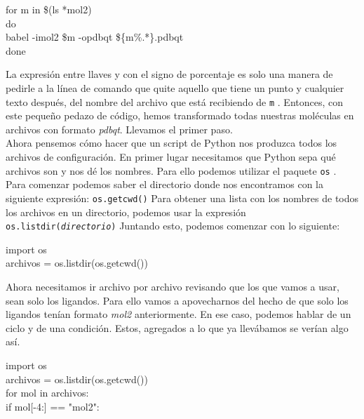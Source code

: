 \documentclass[10pt,letterpaper]{article}
\newcommand{\inlinecode}[1]{
\colorbox{light-gray}{\texttt{#1}}
}
\newenvironment{Code}
{
\begin{lrbox}{\selvestebox}%
\begin{minipage}{\dimexpr\columnwidth-2\fboxsep\relax}
\fontfamily{\ttdefault}\selectfont
}
{\end{minipage}\end{lrbox}%
\begin{center}
\colorbox{light-gray}{\usebox{\selvestebox}}
\end{center}
}
\begin{document}
\begin{Code}
for m in \$(ls *mol2)\\
do\\
babel -imol2 \$m -opdbqt \$\{m\%.*\}.pdbqt\\
done
\end{Code}

La expresi\'on entre llaves y con el signo de porcentaje es solo una manera de pedirle a la l\'inea de comando que quite aquello que tiene un punto y cualquier texto despu\'es, del nombre del archivo que est\'a recibiendo de \inlinecode{m}. Entonces, con este peque\~no pedazo de c\'odigo, hemos transformado todas nuestras mol\'eculas en archivos con formato \emph{pdbqt}. Llevamos el primer paso.\\

Ahora pensemos c\'omo hacer que un script de Python nos produzca todos los archivos de configuraci\'on. En primer lugar necesitamos que Python sepa qu\'e archivos son y nos d\'e los nombres. Para ello podemos utilizar el paquete \inlinecode{os}. Para comenzar podemos saber el directorio donde nos encontramos con la siguiente expresi\'on: \inlinecode{os.getcwd()} Para obtener una lista con los nombres de todos los archivos en un directorio, podemos usar la expresi\'on \inlinecode{os.listdir(\emph{directorio})} Juntando esto, podemos comenzar con lo siguiente:

\begin{Code}
import os\\
archivos = os.listdir(os.getcwd())
\end{Code}

Ahora necesitamos ir archivo por archivo revisando que los que vamos a usar, sean solo los ligandos. Para ello vamos a apovecharnos del hecho de que solo los ligandos ten\'ian formato \emph{mol2} anteriormente. En ese caso, podemos hablar de un ciclo y de una condici\'on. Estos, agregados a lo que ya llev\'abamos se ver\'ian algo as\'i.

\begin{Code}
import os\\
archivos = os.listdir(os.getcwd())\\
for mol in archivos:\\
\hspace*{6mm}if mol[-4:] == "mol2":
\end{Code}
\end{document}
